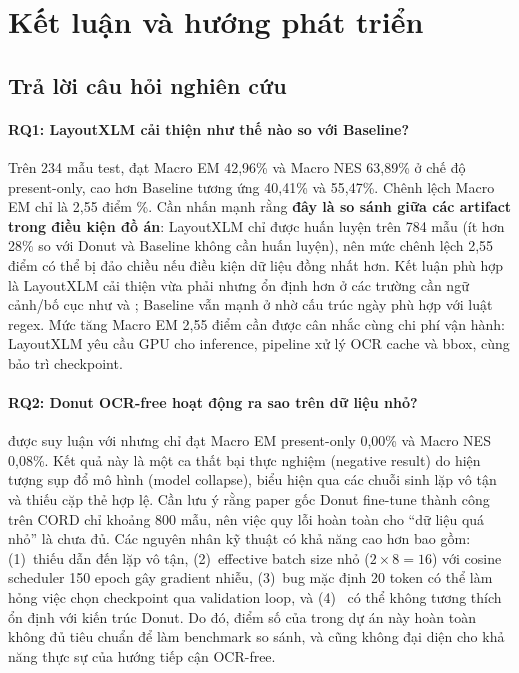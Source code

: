 \section{Kết luận và hướng phát triển}
\label{sec:conclusion}

\subsection{Trả lời câu hỏi nghiên cứu}
\label{subsec:conclusion}

\paragraph{RQ1: LayoutXLM cải thiện như thế nào so với Baseline?}
Trên 234 mẫu test,  đạt Macro EM 42,96\% và Macro NES 63,89\% ở chế độ present-only, cao hơn Baseline tương ứng 40,41\% và 55,47\%. Chênh lệch Macro EM chỉ là 2,55 điểm \%. Cần nhấn mạnh rằng \textbf{đây là so sánh giữa các artifact trong điều kiện đồ án}: LayoutXLM chỉ được huấn luyện trên 784 mẫu (ít hơn 28\% so với Donut và Baseline không cần huấn luyện), nên mức chênh lệch 2,55 điểm có thể bị đảo chiều nếu điều kiện dữ liệu đồng nhất hơn. Kết luận phù hợp là LayoutXLM cải thiện vừa phải nhưng ổn định hơn ở các trường cần ngữ cảnh/bố cục như  và ; Baseline vẫn mạnh ở  nhờ cấu trúc ngày phù hợp với luật regex. Mức tăng Macro EM 2,55 điểm cần được cân nhắc cùng chi phí vận hành: LayoutXLM yêu cầu GPU cho inference, pipeline xử lý OCR cache và bbox, cùng bảo trì checkpoint.

\paragraph{RQ2: Donut OCR-free hoạt động ra sao trên dữ liệu nhỏ?}
 được suy luận với  nhưng chỉ đạt Macro EM present-only 0,00\% và Macro NES 0,08\%. Kết quả này là một ca thất bại thực nghiệm (negative result) do hiện tượng sụp đổ mô hình (model collapse), biểu hiện qua các chuỗi sinh lặp vô tận và thiếu cặp thẻ hợp lệ. Cần lưu ý rằng paper gốc Donut fine-tune thành công trên CORD chỉ khoảng 800 mẫu, nên việc quy lỗi hoàn toàn cho ``dữ liệu quá nhỏ'' là chưa đủ. Các nguyên nhân kỹ thuật có khả năng cao hơn bao gồm: (1)~thiếu  dẫn đến lặp vô tận, (2)~effective batch size nhỏ ($2 \times 8 = 16$) với cosine scheduler 150 epoch gây gradient nhiễu, (3)~bug  mặc định 20 token có thể làm hỏng việc chọn checkpoint qua validation loop, và (4)~ có thể không tương thích ổn định với kiến trúc Donut. Do đó, điểm số của  trong dự án này hoàn toàn không đủ tiêu chuẩn để làm benchmark so sánh, và cũng không đại diện cho khả năng thực sự của hướng tiếp cận OCR-free.

